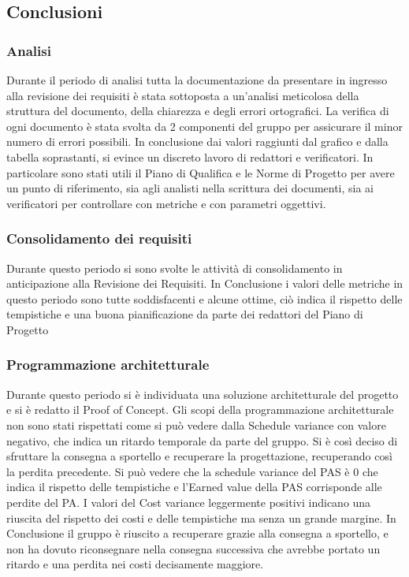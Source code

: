 \subsection{Conclusioni}

\subsubsection{Analisi}
Durante il periodo di analisi tutta la documentazione da presentare in ingresso alla revisione dei requisiti è stata sottoposta a un'analisi meticolosa della struttura del documento, della chiarezza e degli errori ortografici. La verifica di ogni documento è stata svolta da 2 componenti del gruppo per assicurare il minor numero di errori possibili.
\newline
In conclusione dai valori raggiunti dal grafico e dalla tabella soprastanti, si evince un discreto lavoro di redattori e verificatori. In particolare sono stati utili il Piano di Qualifica e le Norme di Progetto per avere un punto di riferimento, sia agli analisti nella scrittura dei documenti, sia ai verificatori per controllare con metriche e con parametri oggettivi.

\subsubsection{Consolidamento dei requisiti}
Durante questo periodo si sono svolte le attività di consolidamento in anticipazione alla Revisione dei Requisiti.
In Conclusione i valori delle metriche in questo periodo sono tutte soddisfacenti e alcune ottime, ciò indica il rispetto delle tempistiche e una buona pianificazione da parte dei redattori del Piano di Progetto

\subsubsection{Programmazione architetturale}
Durante questo periodo si è individuata una soluzione architetturale del progetto e si è redatto il Proof of Concept.
Gli scopi della programmazione architetturale non sono stati rispettati come si può vedere dalla Schedule variance con valore negativo, che indica un ritardo temporale da parte del gruppo.
Si è così deciso di sfruttare la consegna a sportello e recuperare la progettazione, recuperando così la perdita precedente. Si può vedere che la schedule variance del PAS è 0 che indica il rispetto delle tempistiche e l'Earned value della PAS corrisponde alle perdite del PA.
I valori del Cost variance leggermente positivi indicano una riuscita del rispetto dei costi e delle tempistiche ma senza un grande margine.
In Conclusione il gruppo è riuscito a recuperare grazie alla consegna a sportello, e non ha dovuto riconsegnare nella consegna successiva che avrebbe portato un ritardo e una perdita nei costi decisamente maggiore.

